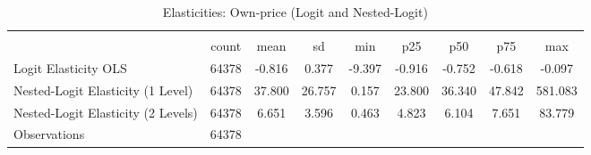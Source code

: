 \begin{table}[htbp]\centering
\def\sym#1{\ifmmode^{#1}\else\(^{#1}\)\fi}
\caption{Elasticities: Own-price (Logit and Nested-Logit)}
\begin{tabular}{l*{1}{cccccccc}}
\toprule
                    &\multicolumn{8}{c}{}                                                                                   \\
                    &       count&        mean&          sd&         min&         p25&         p50&         p75&         max\\
\midrule
Logit Elasticity OLS&       64378&      -0.816&       0.377&      -9.397&      -0.916&      -0.752&      -0.618&      -0.097\\
Nested-Logit Elasticity (1 Level)&       64378&      37.800&      26.757&       0.157&      23.800&      36.340&      47.842&     581.083\\
Nested-Logit Elasticity (2 Levels)&       64378&       6.651&       3.596&       0.463&       4.823&       6.104&       7.651&      83.779\\
\midrule
Observations        &       64378&            &            &            &            &            &            &            \\
\bottomrule
\end{tabular}
\end{table}

